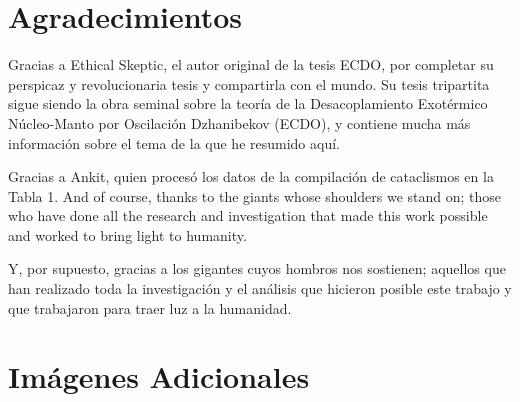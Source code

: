 \documentclass[10pt,twocolumn,letterpaper]{article}
\begin{document}
\section{Agradecimientos}

Gracias a Ethical Skeptic, el autor original de la tesis ECDO, por completar su perspicaz y revolucionaria tesis y compartirla con el mundo. Su tesis tripartita \cite{1} sigue siendo la obra seminal sobre la teoría de la Desacoplamiento Exotérmico Núcleo-Manto por Oscilación Dzhanibekov (ECDO), y contiene mucha más información sobre el tema de la que he resumido aquí.

Gracias a Ankit, quien procesó los datos de la compilación de cataclismos en la Tabla 1.
And of course, thanks to the giants whose shoulders we stand on; those who have done all the research and investigation that made this work possible and worked to bring light to humanity.

Y, por supuesto, gracias a los gigantes cuyos hombros nos sostienen; aquellos que han realizado toda la investigación y el análisis que hicieron posible este trabajo y que trabajaron para traer luz a la humanidad.

\clearpage
\twocolumn

\section{Imágenes Adicionales}
\end{document}
